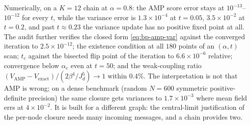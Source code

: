 Numerically, on a $K = 12$ chain at $\alpha = 0.8$: the AMP score error
stays at $10^{-13}$--$10^{-12}$ for every $t$, while the variance error
is $1.3 \times 10^{-4}$ at $t = 0.05$, $3.5 \times 10^{-2}$ at $t = 0.2$,
and past $t \approx 0.23$ the variance update has no positive fixed point
at all. The audit further verifies the closed form \eqref{eq:bp-amp-var}
against the converged iteration to $2.5 \times 10^{-12}$; the existence
condition at all $180$ points of an $(\alpha, t)$ scan; $t_c$ against the
bisected flip point of the iteration to $6.6 \times 10^{-6}$ relative;
convergence below $\alpha_c$ even at $t = 50$; and the weak-coupling
ratio $(V_{\mathrm{AMP}} - V_{\mathrm{exact}})/(2\beta^4/J_d^5) \to 1$
within $0.4\%$. The interpretation is not that AMP is wrong; on a dense
benchmark (random $N = 600$ symmetric positive-definite precision) the
same closure gets variances to $1.7 \times 10^{-3}$ where mean field errs
at $4 \times 10^{-2}$. It is built for a different graph: the
central-limit justification of the per-node closure needs many incoming
messages, and a chain provides two.
